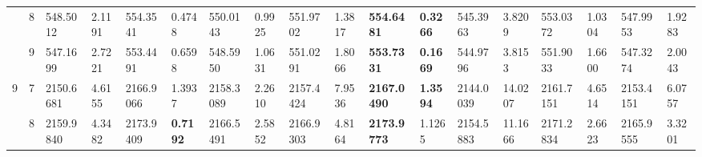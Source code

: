 \documentclass[conference]{IEEEtran}
\begin{document}
\begin{table*}[]
\begin{tabular}{|cc|ll|ll|ll|ll|ll|ll|ll|ll|}
		\multicolumn{1}{|c|}{}                            & 8                               & \multicolumn{1}{l|}{548.5012}          & 2.1191                            & \multicolumn{1}{l|}{554.3541}           & 0.4748                            & \multicolumn{1}{l|}{550.0143}          & 0.9925                            & \multicolumn{1}{l|}{551.9702}          & 1.3817                            & \multicolumn{1}{l|}{\textbf{554.6481}}  & \textbf{0.3266}                   & \multicolumn{1}{l|}{545.3963}          & 3.8209                            & \multicolumn{1}{l|}{553.0372}          & 1.0304                            & \multicolumn{1}{l|}{547.9953}          & 1.9283                            \\ \cline{2-18} 
		\multicolumn{1}{|c|}{}                            & 9                               & \multicolumn{1}{l|}{547.1699}          & 2.7221                            & \multicolumn{1}{l|}{553.4491}           & 0.6598                            & \multicolumn{1}{l|}{548.5950}          & 1.0631                            & \multicolumn{1}{l|}{551.0291}          & 1.8066                            & \multicolumn{1}{l|}{\textbf{553.7331}}  & \textbf{0.1669}                   & \multicolumn{1}{l|}{544.9796}          & 3.8153                            & \multicolumn{1}{l|}{551.9033}          & 1.6600                            & \multicolumn{1}{l|}{547.3274}          & 2.0043                            \\ \hline
		\multicolumn{1}{|c|}{\multirow{3}{*}{9}}          & 7                               & \multicolumn{1}{l|}{2150.6681}         & 4.6155                            & \multicolumn{1}{l|}{2166.9066}          & 1.3937                            & \multicolumn{1}{l|}{2158.3089}         & 2.2610                            & \multicolumn{1}{l|}{2157.4424}         & 7.9536                            & \multicolumn{1}{l|}{\textbf{2167.0490}} & \textbf{1.3594}                   & \multicolumn{1}{l|}{2144.0039}         & 14.0207                           & \multicolumn{1}{l|}{2161.7151}         & 4.6514                            & \multicolumn{1}{l|}{2153.4151}         & 6.0757                            \\ \cline{2-18} 
		\multicolumn{1}{|c|}{}                            & 8                               & \multicolumn{1}{l|}{2159.9840}         & 4.3482                            & \multicolumn{1}{l|}{2173.9409}          & \textbf{0.7192}                   & \multicolumn{1}{l|}{2166.5491}         & 2.5852                            & \multicolumn{1}{l|}{2166.9303}         & 4.8164                            & \multicolumn{1}{l|}{\textbf{2173.9773}} & 1.1265                            & \multicolumn{1}{l|}{2154.5883}         & 11.1666                           & \multicolumn{1}{l|}{2171.2834}         & 2.6623                            & \multicolumn{1}{l|}{2165.9555}         & 3.3201                            \\ \cline{2-18} 

\end{tabular}
\end{table*}
\end{document}
